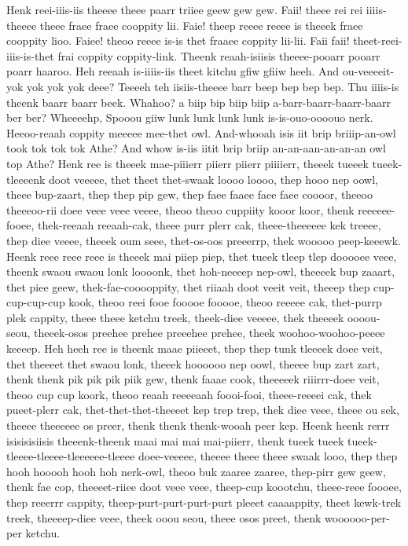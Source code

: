 \documentclass[12pt,a4paper]{article}
\begin{document}
\begin{drama}
\pistspeaks
Henk reei-iiis-iis theeee theee paarr triiee geew gew gew.
\euelspeaks
Faii! theee rei rei iiiis-theeee theee fraee fraee cooppity lii. Faie! theep reeee reeee is theeek fraee cooppity lioo. Faiee! theoo reeee is-is thet fraaee coppity lii-lii. Faii faii! theet-reei-iiis-is-thet frai coppity coppity-link.
\pistspeaks
Theenk reaah-isiisis theeee-pooarr pooarr poarr haaroo.
\euelspeaks
Heh reeaah is-iiiis-iis theet kitchu gfiw gfiiw heeh. And ou-veeeeit-yok yok yok yok deee?
\epopspeaks
Teeeeh teh iisiis-theeee barr beep bep bep bep. Thu iiiis-is theenk baarr baarr beek.
\euelspeaks
Whahoo? a biip bip biip biip a-barr-baarr-baarr-baarr ber ber?
\pistspeaks
Wheeeehp, Spooou giiw lunk lunk lunk lunk is-is-ouo-oooouo nerk. Heeoo-reaah coppity meeeee mee-thet owl.
\euelspeaks
And-whooah isis iit brip briiip-an-owl took tok tok tok Athe? And whow is-iis iitit brip briip an-an-aan-an-an-an owl top Athe?
\pistspeaks
Henk ree is theeek mae-piiierr piierr piierr piiiierr, theeek tueeek tueek-tleeeenk doot veeeee, thet theet thet-swaak loooo loooo, thep hooo nep oowl, theee bup-zaart, thep thep pip gew, thep faee faaee faee faee coooor, theeoo theeeoo-rii doee veee veee veeee, theoo theoo cuppiity kooor koor, thenk reeeeee-fooee, thek-reeaah reeaah-cak, theee purr plerr cak, theee-theeeeee kek treeee, thep diee veeee, theeek oum seee, thet-os-oos preeerrp, thek wooooo peep-keeewk. Heenk reee reee reee is theeek mai piiep piep, thet tueek tleep tlep dooooee veee, theenk swaou swaou lonk loooonk, thet hoh-neeeep nep-owl, theeeek bup zaaart, thet piee geew, thek-fae-cooooppity, thet riiaah doot veeit veit, theeep thep cup-cup-cup-cup kook, theoo reei fooe fooooe fooooe, theoo reeeee cak, thet-purrp plek cappity, theee theee ketchu treek, theek-diee veeeee, thek theeeek oooou-seou, theeek-osos preehee prehee preeehee prehee, theek woohoo-woohoo-peeee keeeep. Heh heeh ree is theenk maae piieeet, thep thep tunk tleeeek doee veit, thet theeeet thet swaou lonk, theeek hoooooo nep oowl, theeee bup zart zart, thenk thenk pik pik pik piik gew, thenk faaae cook, theeeeek riiirrr-doee veit, theoo cup cup koork, theoo reaah reeeeaah foooi-fooi, theee-reeeei cak, thek pueet-plerr cak, thet-thet-thet-theeeet kep trep trep, thek diee veee, theee ou sek, theeee theeeeee os preer, thenk thenk thenk-wooah peer kep. Heenk heenk rerrr isisisisiisis theeenk-theenk maai mai mai mai-piierr, thenk tueek tueek tueek-tleeee-tleeee-tleeeeee-tleeee doee-veeeee, theeee theee theee swaak looo, thep thep hooh hooooh hooh hoh nerk-owl, theoo buk zaaree zaaree, thep-pirr gew geew, thenk fae cop, theeeet-riiee doot veee veee, theep-cup koootchu, theee-reee foooee, thep reeerrr cappity, theep-purt-purt-purt-purt pleeet caaaappity, theet kewk-trek treek, theeeep-diee veee, theek ooou seou, theee osos preet, thenk woooooo-per-per ketchu.

\end{drama}
\end{document}
